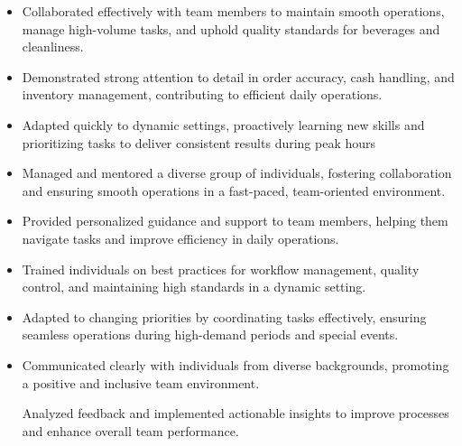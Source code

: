 \documentclass[10pt,a4paper,ragged2e,withhyper]{altacv}
\begin{document}
\begin{paracol}{2}


\begin{itemize}
    \item Collaborated effectively with team members to maintain smooth operations, manage high-volume tasks, and uphold quality standards for beverages and cleanliness.
    \item Demonstrated strong attention to detail in order accuracy, cash handling, and inventory management, contributing to efficient daily operations.
    \item Adapted quickly to dynamic settings, proactively learning new skills and prioritizing tasks to deliver consistent results during peak hours
\end{itemize}
\begin{itemize}
    \item    Managed and mentored a diverse group of individuals, fostering collaboration and ensuring smooth operations in a fast-paced, team-oriented environment.

    \item    Provided personalized guidance and support to team members, helping them navigate tasks and improve efficiency in daily operations.

    \item    Trained individuals on best practices for workflow management, quality control, and maintaining high standards in a dynamic setting.

    \item    Adapted to changing priorities by coordinating tasks effectively, ensuring seamless operations during high-demand periods and special events.

    \item    Communicated clearly with individuals from diverse backgrounds, promoting a positive and inclusive team environment.

    Analyzed feedback and implemented actionable insights to improve processes and enhance overall team performance.
\end{itemize}





\end{paracol}
\end{document}
